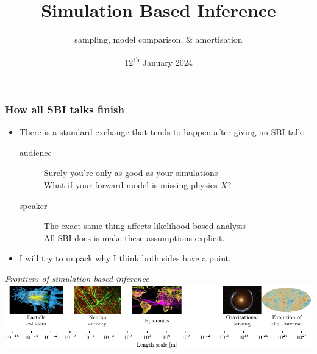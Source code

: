 \documentclass[aspectratio=169]{beamer}
\title{Simulation Based Inference}
\subtitle{sampling, model comparison, \& amortisation}
\date{12\textsuperscript{th} January 2024}
\begin{document}
\begin{frame}
    \titlepage
\end{frame}

\begin{frame}
    \frametitle{How all SBI talks finish}
    \begin{itemize}
        \item There is a standard exchange that tends to happen after giving an SBI talk:

            \begin{description}
                \item[audience] Surely you're only as good as your simulations ---\\What if your forward model is missing physics $X$?
                \item[speaker] The exact same thing affects likelihood-based analysis ---\\
                    All SBI does is make these assumptions explicit.
            \end{description}
        \item I will try to unpack why I think both sides have a point.
    \end{itemize}
    \vspace{10pt}
\hfill \textit{Frontiers of simulation based inference}~
    \includegraphics[width=\textwidth]{figures/sbi_range.pdf}
\end{frame}
\end{document}
